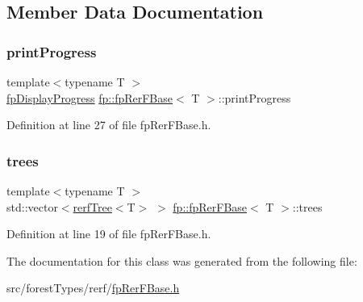 \subsection{Member Data Documentation}
\mbox{\label{classfp_1_1fpRerFBase_a539e79a960846182fc49420d79896ba1}} 
\subsubsection{\texorpdfstring{print\+Progress}{printProgress}}
{\footnotesize\ttfamily template$<$typename T $>$ \\
\hyperlink{classfp_1_1fpDisplayProgress}{fp\+Display\+Progress} \hyperlink{classfp_1_1fpRerFBase}{fp\+::fp\+Rer\+F\+Base}$<$ T $>$\+::print\+Progress}



Definition at line 27 of file fp\+Rer\+F\+Base.\+h.

\mbox{\label{classfp_1_1fpRerFBase_a6c2f12312e64e5234fc53741f1bfbe96}} 
\subsubsection{\texorpdfstring{trees}{trees}}
{\footnotesize\ttfamily template$<$typename T $>$ \\
std\+::vector$<$\hyperlink{classfp_1_1rerfTree}{rerf\+Tree}$<$T$>$ $>$ \hyperlink{classfp_1_1fpRerFBase}{fp\+::fp\+Rer\+F\+Base}$<$ T $>$\+::trees\hspace{0.3cm}{\ttfamily [protected]}}



Definition at line 19 of file fp\+Rer\+F\+Base.\+h.



The documentation for this class was generated from the following file\+:\begin{DoxyCompactItemize}
\item 
src/forest\+Types/rerf/\hyperlink{fpRerFBase_8h}{fp\+Rer\+F\+Base.\+h}\end{DoxyCompactItemize}
